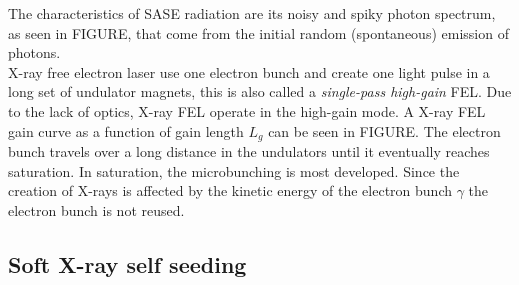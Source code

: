 The characteristics of SASE radiation are its noisy and spiky photon spectrum, as seen in FIGURE, that come from the initial random (spontaneous) emission of photons.\\
X-ray free electron laser use one electron bunch and create one light pulse in a long set of undulator magnets, this is also called a \textit{single-pass high-gain} FEL. Due to the lack of optics, X-ray FEL operate in the high-gain mode. A X-ray FEL gain curve as a function of gain length $L_{g}$ can be seen in FIGURE. The electron bunch travels over a long distance in the undulators until it eventually reaches saturation. In saturation, the microbunching is most developed. Since the creation of X-rays is affected by the kinetic energy of the electron bunch $\gamma$ the electron bunch is not reused.
\subsection{Soft X-ray self seeding}
